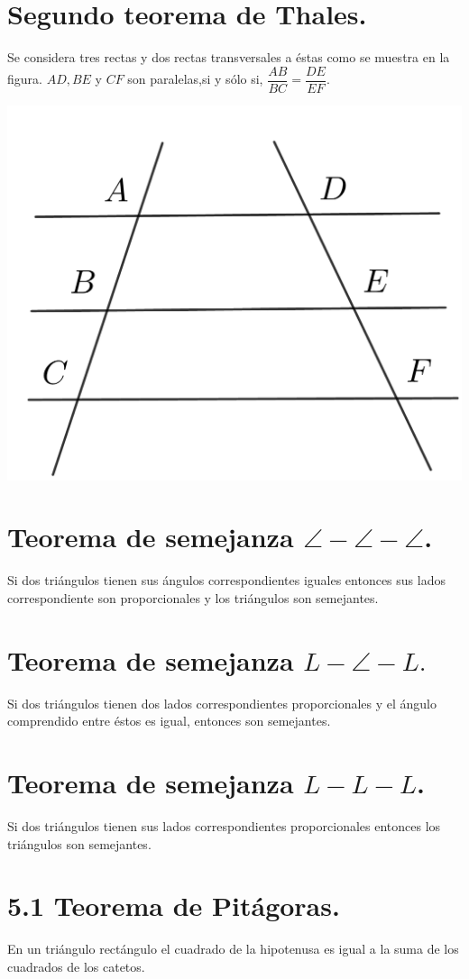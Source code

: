 \documentclass[12pt,a4paper]{book}
\begin{document}
\section{Segundo teorema de Thales.}
Se considera tres rectas y dos rectas transversales a éstas como se muestra en la figura. $AD, BE$ y $CF$ son paralelas,si y sólo si, $\dfrac{AB}{BC}=\dfrac{DE}{EF}$.
\begin{center}
\includegraphics[scale=0.45]{Imagenes/thales.png}
\end{center} 
\newpage
\section{Teorema de semejanza $\angle -\angle -\angle$.}
Si dos triángulos tienen sus ángulos correspondientes iguales entonces sus lados correspondiente son proporcionales y los triángulos son semejantes.
\section{Teorema de semejanza $L-\angle - L.$}
Si dos triángulos tienen dos lados correspondientes proporcionales y el ángulo comprendido entre éstos es igual, entonces son semejantes.
\section{Teorema de semejanza $L-L-L$.}
Si dos triángulos tienen sus lados correspondientes proporcionales entonces los triángulos son semejantes.
\section{5.1 Teorema de Pitágoras.}
En un triángulo rectángulo el cuadrado de la hipotenusa es igual a la suma de los cuadrados de los catetos.
\end{document}
